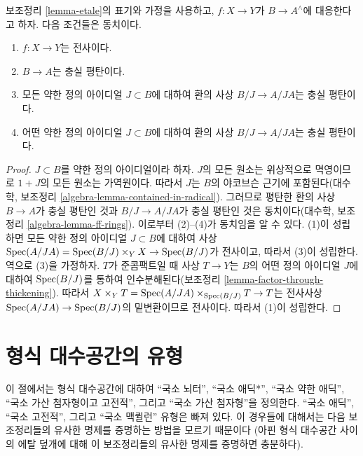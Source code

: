 \begin{lemma}
\label{lemma-etale-surjective}
보조정리 \ref{lemma-etale}의 표기와 가정을 사용하고,
$f : X \to Y$가 $B \to A^\wedge$에 대응한다고 하자. 다음 조건들은
동치이다.
\begin{enumerate}
\item $f : X \to Y$는 전사이다.
\item $B \to A$는 충실 평탄이다.
\item 모든 약한 정의 아이디얼 $J \subset B$에 대하여 환의 사상
$B/J \to A/JA$는 충실 평탄이다.
\item 어떤 약한 정의 아이디얼 $J \subset B$에 대하여 환의 사상
$B/J \to A/JA$는 충실 평탄이다.
\end{enumerate}
\end{lemma}

\begin{proof}
$J \subset B$를 약한 정의 아이디얼이라 하자. $J$의 모든 원소는
위상적으로 멱영이므로 $1 + J$의 모든 원소는 가역원이다.
따라서 $J$는 $B$의 야코브슨 근기에 포함된다(대수학, 보조정리
\ref{algebra-lemma-contained-in-radical}). 그러므로 평탄한 환의 사상
$B \to A$가 충실 평탄인 것과 $B/J \to A/JA$가 충실 평탄인 것은
동치이다(대수학, 보조정리 \ref{algebra-lemma-ff-rings}).
이로부터 (2)--(4)가 동치임을 알 수 있다. (1)이 성립하면 모든 약한
정의 아이디얼 $J \subset B$에 대하여 사상
$\mathop{\mathrm{Spec}}(A/JA) = \mathop{\mathrm{Spec}}(B/J) \times_Y X \to \mathop{\mathrm{Spec}}(B/J)$가 전사이고,
따라서 (3)이 성립한다. 역으로 (3)을 가정하자. $T$가 준콤팩트일 때
사상 $T \to Y$는 $B$의 어떤 정의 아이디얼 $J$에 대하여 %
$\mathop{\mathrm{Spec}}(B/J)$를 통하여 인수분해된다(보조정리
\ref{lemma-factor-through-thickening}). 따라서
$X \times_Y T = \mathop{\mathrm{Spec}}(A/JA) \times_{\mathop{\mathrm{Spec}}(B/J)} T \to T$는
전사사상 $\mathop{\mathrm{Spec}}(A/JA) \to \mathop{\mathrm{Spec}}(B/J)$의 밑변환이므로 전사이다.
따라서 (1)이 성립한다.
\end{proof}

\section{형식 대수공간의 유형}
\label{section-types}

\noindent
이 절에서는 형식 대수공간에 대하여
``국소 뇌터'',
``국소 애딕*'',
``국소 약한 애딕'',
``국소 가산 첨자형이고 고전적'', 그리고
``국소 가산 첨자형''을 정의한다.
``국소 애딕'',
``국소 고전적'', 그리고
``국소 맥퀼런'' 유형은 빠져 있다. 이 경우들에 대해서는 다음
보조정리들의 유사한 명제를 증명하는 방법을 모르기 때문이다
(아핀 형식 대수공간 사이의 에탈 덮개에 대해 이 보조정리들의
유사한 명제를 증명하면 충분하다).

